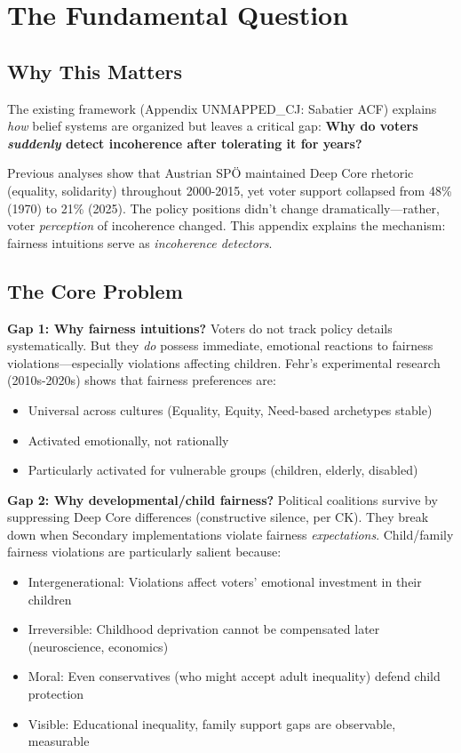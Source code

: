 \section{The Fundamental Question}
\label{sec:cm-fundamental}

\subsection{Why This Matters}

The existing framework (Appendix UNMAPPED_CJ: Sabatier ACF) explains \textit{how} belief systems are organized
but leaves a critical gap: \textbf{Why do voters \textit{suddenly} detect incoherence after tolerating
it for years?}

Previous analyses show that Austrian SPÖ maintained Deep Core rhetoric (equality, solidarity)
throughout 2000-2015, yet voter support collapsed from 48\% (1970) to 21\% (2025). The policy
positions didn't change dramatically---rather, voter \textit{perception} of incoherence changed.
This appendix explains the mechanism: fairness intuitions serve as \textit{incoherence detectors}.

\subsection{The Core Problem}

\textbf{Gap 1: Why fairness intuitions?}
Voters do not track policy details systematically. But they \textit{do} possess immediate,
emotional reactions to fairness violations---especially violations affecting children. Fehr's
experimental research (2010s-2020s) shows that fairness preferences are:
\begin{itemize}[nosep]
\item Universal across cultures (Equality, Equity, Need-based archetypes stable)
\item Activated emotionally, not rationally
\item Particularly activated for vulnerable groups (children, elderly, disabled)
\end{itemize}

\textbf{Gap 2: Why developmental/child fairness?}
Political coalitions survive by suppressing Deep Core differences (constructive silence, per CK).
They break down when Secondary implementations violate fairness \textit{expectations}. Child/family
fairness violations are particularly salient because:
\begin{itemize}[nosep]
\item Intergenerational: Violations affect voters' emotional investment in their children
\item Irreversible: Childhood deprivation cannot be compensated later (neuroscience, economics)
\item Moral: Even conservatives (who might accept adult inequality) defend child protection
\item Visible: Educational inequality, family support gaps are observable, measurable
\end{itemize}

